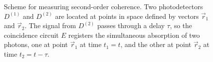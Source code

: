 \begin{figure}
\centering



\caption{Scheme for measuring second-order coherence. Two
  photodetectors $D^{(1)}$ and $D^{(2)}$ are located at points in space
  defined by vectors $\vec{r}_1$ and $\vec{r}_2$. The signal from $D^{(2)}$
passes through a delay $\tau$, so the coincidence circuit $E$
registers the simultaneous absorption of two photons, one at point
$\vec{r}_1$ at time $t_1 = t$, and the other at point
$\vec{r}_2$ at time $t_2 = t - \tau$.}
\label{figPart4Ch2_add1}
\end{figure}